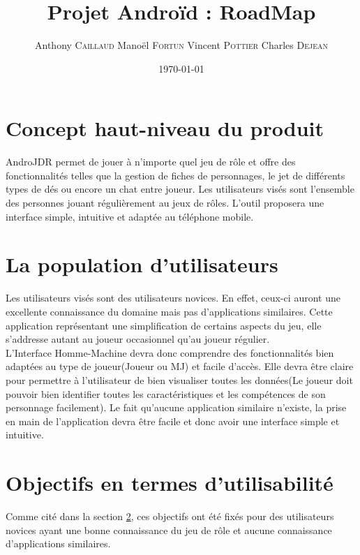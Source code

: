 \documentclass[11pt,a4paper]{article}
\title{Projet Androïd : RoadMap}
\author{Anthony \textsc{Caillaud} Manoël \textsc{Fortun} Vincent
\textsc{Pottier} Charles \textsc{Dejean}}
\date{\today}
\begin{document}
\maketitle

\clearpage
\tableofcontents
\clearpage
\section{Concept haut-niveau du produit}

AndroJDR permet de jouer à n'importe quel jeu de rôle et offre des
fonctionnalités telles que la gestion de fiches de personnages, le jet de
différents types de dés ou encore un chat entre joueur. Les utilisateurs visés
sont l'ensemble des personnes jouant régulièrement au jeux de rôles. L'outil
proposera une interface simple, intuitive et adaptée au téléphone mobile.

\section{La population d'utilisateurs}
\label{utilisateurs}

Les utilisateurs visés sont des utilisateurs novices. En effet, ceux-ci auront
une excellente connaissance du domaine mais pas d'applications similaires.
Cette application représentant une simplification de certains aspects du jeu,
elle s'addresse autant au joueur occasionnel qu'au joueur régulier.\\

L'Interface Homme-Machine devra donc comprendre des fonctionnalités bien
adaptées au type de joueur(Joueur ou MJ) et facile d'accès. Elle devra être
claire pour permettre à l'utilisateur de bien visualiser toutes les données(Le
joueur doit pouvoir bien identifier toutes les caractéristiques et les compétences de
son personnage facilement). Le fait qu'aucune application similaire n'existe,
la prise en main de l'application devra être facile et donc avoir une interface
simple et intuitive.
	

\section{Objectifs en termes d'utilisabilité}

Comme cité dans la section \ref{utilisateurs}, ces objectifs ont été fixés pour
des utilisateurs novices ayant une bonne connaissance du jeu de rôle et aucune
connaissance d'applications similaires.\\
\end{document}
